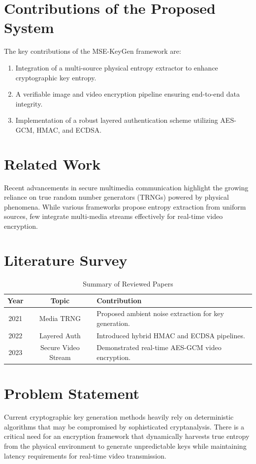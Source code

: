 \documentclass[conference]{IEEEtran}
\begin{document}
\section{Contributions of the Proposed System}
The key contributions of the MSE-KeyGen framework are:
\begin{enumerate}
    \item Integration of a multi-source physical entropy extractor to enhance cryptographic key entropy.
    \item A verifiable image and video encryption pipeline ensuring end-to-end data integrity.
    \item Implementation of a robust layered authentication scheme utilizing AES-GCM, HMAC, and ECDSA.
\end{enumerate}

\section{Related Work}
Recent advancements in secure multimedia communication highlight the growing reliance on true random number generators (TRNGs) powered by physical phenomena. While various frameworks propose entropy extraction from uniform sources, few integrate multi-media streams effectively for real-time video encryption.

\section{Literature Survey}

\begin{table}[htbp]
\caption{Summary of Reviewed Papers}
\begin{center}
\begin{tabular}{|c|c|p{4cm}|}
\hline
\textbf{Year} & \textbf{Topic} & \textbf{Contribution} \\
\hline
2021 & Media TRNG & Proposed ambient noise extraction for key generation. \\
\hline
2022 & Layered Auth & Introduced hybrid HMAC and ECDSA pipelines. \\
\hline
2023 & Secure Video Stream & Demonstrated real-time AES-GCM video encryption. \\
\hline
\end{tabular}
\label{tab:literature}
\end{center}
\end{table}

\section{Problem Statement}
Current cryptographic key generation methods heavily rely on deterministic algorithms that may be compromised by sophisticated cryptanalysis. There is a critical need for an encryption framework that dynamically harvests true entropy from the physical environment to generate unpredictable keys while maintaining latency requirements for real-time video transmission.
\end{document}
